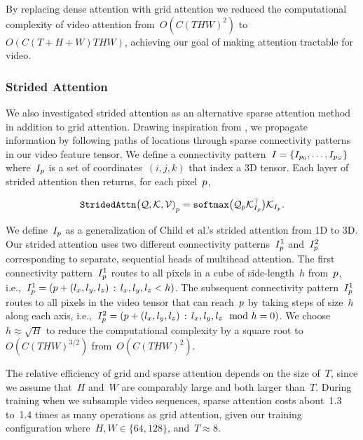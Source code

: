 By replacing dense attention with grid attention we reduced the computational
complexity of video attention from~$O(C{(THW)}^2)$ to~$O(C(T + H + W)THW)$,
achieving our goal of making attention tractable for video.

%


\subsubsection{Strided Attention}

We also investigated strided attention as an alternative sparse attention
method in addition to grid attention.
Drawing inspiration from \citet{child2019sparsetransformer}, we
propagate information by following paths of locations through sparse
connectivity patterns in our video feature tensor.
We define a connectivity
pattern~$I = \{I_{p{}_0}, \dots, I_{p{}_S}\}$
where~$I_p{}$ is a set of coordinates~$(i, j, k)$ that index a 3D tensor.
Each layer of strided attention then returns, for each pixel~$p{}$,

\begin{equation}
\mathtt{StridedAttn}{\big(\mathcal{Q}{}, \mathcal{K}{}, \mathcal{V}{})}_p{} = \mathtt{softmax}{}\big(\mathcal{Q}{}_p{} \mathcal{K}{}^\top_{I_p{}}\big)\mathcal{K}{}_{I_p{}}.
\label{eqn:stridedattndefn}
\end{equation}

We define~$I_p{}$ as a generalization of Child et al.'s strided attention
from 1D to 3D\@.
Our strided attention uses two different connectivity patterns~$I^1_p{}$
and~$I^2_p{}$ corresponding to separate, sequential heads of multihead
attention.
The first connectivity pattern~$I^1_p{}$ routes to all pixels in a cube of
side-length~$h$ from~$p{}$,
i.e.,~$I^1_p{} = (p{} + (l_x, l_y, l_z) \,:\, l_x, l_y, l_z < h)$.
The subsequent connectivity pattern~$I^1_p{}$ routes to all pixels in the
video tensor that can reach~$p{}$ by taking steps of size~$h$ along each
axis,
i.e.,~$I^2_p{} = (p{} + (l_x, l_y, l_z) \,:\, l_x, l_y, l_z \mod h = 0)$.
We choose~$h\approx \sqrt{H}$ to reduce the computational complexity by a
square root to~$O(C{(THW)}^{3/2})$ from~$O(C{(THW)}^2)$.

The relative efficiency of grid and sparse attention depends on the size
of~$T$, since we assume that~$H$ and~$W$ are comparably large and both larger
than~$T$.
During training when we subsample video sequences, sparse attention costs
about~\num{1.3} to~\num{1.4} times as many operations as grid attention, given
our training configuration where~$H, W \in \{64, 128\}$, and~$T\approx 8$.


